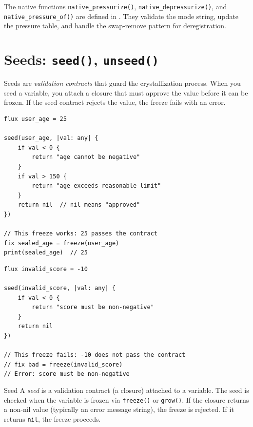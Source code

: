 The native functions \lstinline|native_pressurize()|, \lstinline|native_depressurize()|, and \lstinline|native_pressure_of()| are defined in .
They validate the mode string, update the pressure table, and handle the swap-remove pattern for deregistration.


\section{Seeds: \texttt{seed()}, \texttt{unseed()}}\label{sec:seeds}


Seeds are \emph{validation contracts} that guard the crystallization process.
When you seed a variable, you attach a closure that must approve the value before it can be frozen.
If the seed contract rejects the value, the freeze fails with an error.

\begin{lstlisting}[language=Lattice, caption={Setting a seed contract}]
flux user_age = 25

seed(user_age, |val: any| {
    if val < 0 {
        return "age cannot be negative"
    }
    if val > 150 {
        return "age exceeds reasonable limit"
    }
    return nil  // nil means "approved"
})

// This freeze works: 25 passes the contract
fix sealed_age = freeze(user_age)
print(sealed_age)  // 25
\end{lstlisting}

\begin{lstlisting}[language=Lattice, caption={Seed contract rejecting a freeze}]
flux invalid_score = -10

seed(invalid_score, |val: any| {
    if val < 0 {
        return "score must be non-negative"
    }
    return nil
})

// This freeze fails: -10 does not pass the contract
// fix bad = freeze(invalid_score)
// Error: score must be non-negative
\end{lstlisting}

\begin{defnbox}{Seed}
A \emph{seed} is a validation contract (a closure) attached to a variable.
The seed is checked when the variable is frozen via \lstinline|freeze()| or \lstinline|grow()|.
If the closure returns a non-nil value (typically an error message string), the freeze is rejected.
If it returns \lstinline|nil|, the freeze proceeds.
\end{defnbox}

